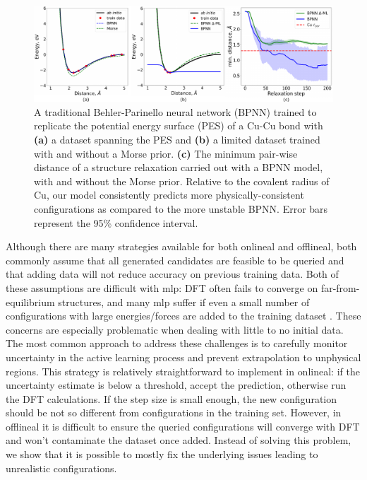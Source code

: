 \documentclass[
 reprint,
 amsmath,
 amssymb,
 aps,
]{revtex4-1}
\begin{document}
\begin{figure}[!th]
    \centering
    \includegraphics[width=\textwidth]{figures/figure_1.pdf}
    \caption{A traditional Behler-Parinello neural network (BPNN) trained to replicate the potential energy surface (PES) of a Cu-Cu bond with \textbf{(a)} a dataset spanning the PES and \textbf{(b)} a limited dataset trained with and without a Morse prior. \textbf{(c)} The minimum pair-wise distance of a structure relaxation carried out with a BPNN model, with and without the Morse prior. Relative to the covalent radius of Cu, our model consistently predicts more physically-consistent configurations as compared to the more unstable BPNN. Error bars represent the 95\% confidence interval.}
    \label{fig:bond}
\end{figure}  

Although there are many strategies available for both \gls{onlineal} and \gls{offlineal}, both commonly assume that all generated candidates are feasible to be queried and that adding data will not reduce accuracy on previous training data. Both of these assumptions are difficult with \gls{mlp}: \gls{DFT} often fails to converge on far-from-equilibrium structures, and many \gls{mlp} suffer if even a small number of configurations with large energies/forces are added to the training dataset \cite{GarridoTorres2019}. These concerns are especially problematic when dealing with little to no initial data. The most common approach to address these challenges is to carefully monitor uncertainty in the active learning process and prevent extrapolation to unphysical regions. This strategy is relatively straightforward to implement in \gls{onlineal}: if the uncertainty estimate is below a threshold, accept the prediction, otherwise run the DFT calculations. If the step size is small enough, the new configuration should be not so different from configurations in the training set. However, in \gls{offlineal} it is difficult to ensure the queried configurations will converge with \gls{DFT} and won't contaminate the dataset once added. Instead of solving this problem, we show that it is possible to mostly fix the underlying issues leading to unrealistic configurations. 
\end{document}

